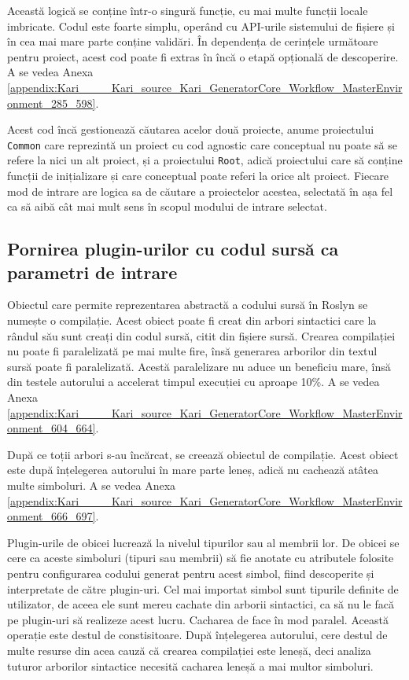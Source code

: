 \documentclass[a4paper,12pt]{report}
\begin{document}
Această logică se conține într-o singură funcție, cu mai multe funcții locale imbricate.
Codul este foarte simplu, operând cu \ac{API}-urile sistemului de fișiere și în cea mai mare parte conține validări.
În dependența de cerințele următoare pentru proiect, acest cod poate fi extras în încă o etapă opțională de descoperire.
A se vedea Anexa \ref{appendix:Kari____Kari_source_Kari_GeneratorCore_Workflow_MasterEnvironment_285_598}.

Acest cod încă gestionează căutarea acelor două proiecte, anume proiectului \texttt{Common} care reprezintă un proiect cu cod agnostic care conceptual nu poate să se refere la nici un alt proiect, și a proiectului \texttt{Root}, adică proiectului care să conține funcții de inițializare și care conceptual poate referi la orice alt proiect.
Fiecare mod de intrare are logica sa de căutare a proiectelor acestea, selectată în așa fel ca să aibă cât mai mult sens în scopul modului de intrare selectat.

\subsection{Pornirea plugin-urilor cu codul sursă ca parametri de intrare}

Obiectul care permite reprezentarea abstractă a codului sursă în Roslyn se numește o compilație.
Acest obiect poate fi creat din arbori sintactici care la rândul său sunt creați din codul sursă, citit din fișiere sursă.
Crearea compilației nu poate fi paralelizată pe mai multe fire, însă generarea arborilor din textul sursă poate fi paralelizată.
Acestă paralelizare nu aduce un beneficiu mare, însă din testele autorului a accelerat timpul execuției cu aproape 10\%.
A se vedea Anexa \ref{appendix:Kari____Kari_source_Kari_GeneratorCore_Workflow_MasterEnvironment_604_664}.

După ce toții arbori s-au încărcat, se creează obiectul de compilație.
Acest obiect este după înțelegerea autorului în mare parte leneș, adică nu cachează atâtea multe simboluri.
A se vedea Anexa \ref{appendix:Kari____Kari_source_Kari_GeneratorCore_Workflow_MasterEnvironment_666_697}.

Plugin-urile de obicei lucrează la nivelul tipurilor sau al membrii lor.
De obicei se cere ca aceste simboluri (tipuri sau membrii) să fie anotate cu atributele folosite pentru configurarea codului generat pentru acest simbol, fiind descoperite și interpretate de către plugin-uri.
Cel mai importat simbol sunt tipurile definite de utilizator, de aceea ele sunt mereu cachate din arborii sintactici, ca să nu le facă pe plugin-uri să realizeze acest lucru.
Cacharea de face în mod paralel.
Această operație este destul de constisitoare.
După înțelegerea autorului, cere destul de multe resurse din acea cauză că crearea compilației este leneșă, deci analiza tuturor arborilor sintactice necesită cacharea leneșă a mai multor simboluri.
\inputminted[firstline=699, lastline=727]{cs}{../Kari/source/Kari.GeneratorCore/Workflow/MasterEnvironment.cs}
\end{document}
